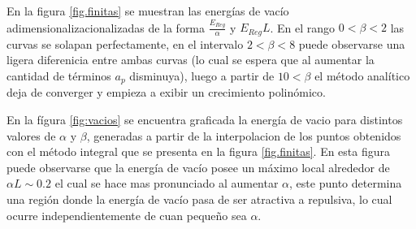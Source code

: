 En la figura \ref{fig.finitas} se muestran las energías de vacío adimensionalizacionalizadas de la forma $\frac{E _{Reg}}{\alpha}$ y $E _{Reg} L$. En el rango $0 < \beta < 2$ las curvas se solapan perfectamente, en el intervalo $2 < \beta < 8$ puede observarse una ligera diferenicia entre ambas curvas (lo cual se espera que al aumentar la cantidad de términos $a _p$ disminuya), luego a partir de $10 < \beta$ el método analítico  deja de converger y empieza a exibir un crecimiento polinómico.

En la fígura \ref{fig:vacios} se encuentra graficada la energía de vacio para distintos valores de $\alpha$ y $\beta$, generadas a partir de la interpolacion de los puntos obtenidos con el método integral que se presenta en la figura \ref{fig.finitas}. En esta figura puede observarse que la energía de vacío posee un máximo local alrededor de $\alpha L \sim 0.2$ el cual se hace mas pronunciado al aumentar $\alpha$, este punto determina una región donde la energía de vacío pasa de ser atractiva a repulsiva, lo cual ocurre independientemente de cuan pequeño sea $\alpha$.

